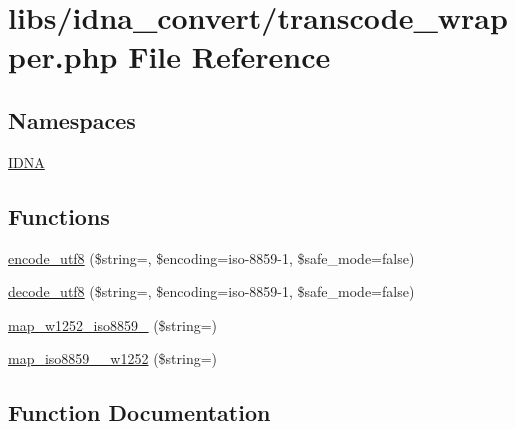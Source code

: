 \hypertarget{transcode__wrapper_8php}{}\section{libs/idna\+\_\+convert/transcode\+\_\+wrapper.php File Reference}
\label{transcode__wrapper_8php}
\subsection*{Namespaces}
\begin{DoxyCompactItemize}
\item 
 \hyperlink{namespaceIDNA}{I\+D\+NA}
\end{DoxyCompactItemize}
\subsection*{Functions}
\begin{DoxyCompactItemize}
\item 
\hyperlink{transcode__wrapper_8php_a147306b164c54c2137611b5e34e68695}{encode\+\_\+utf8} (\$string=\textquotesingle{}\textquotesingle{}, \$encoding=\textquotesingle{}iso-\/8859-\/1\textquotesingle{}, \$safe\+\_\+mode=false)
\item 
\hyperlink{transcode__wrapper_8php_aec7fb3aa5901e2464b528cfcfef90286}{decode\+\_\+utf8} (\$string=\textquotesingle{}\textquotesingle{}, \$encoding=\textquotesingle{}iso-\/8859-\/1\textquotesingle{}, \$safe\+\_\+mode=false)
\item 
\hyperlink{transcode__wrapper_8php_ab498abf492a3888848b6b0166994d801}{map\+\_\+w1252\+\_\+iso8859\+\_} (\$string=\textquotesingle{}\textquotesingle{})
\item 
\hyperlink{transcode__wrapper_8php_a0602d74ebe1154bc91bfce79d7274a65}{map\+\_\+iso8859\+\_\+\_\+w1252} (\$string=\textquotesingle{}\textquotesingle{})
\end{DoxyCompactItemize}


\subsection{Function Documentation}
\mbox{\label{transcode__wrapper_8php_aec7fb3aa5901e2464b528cfcfef90286}} 

